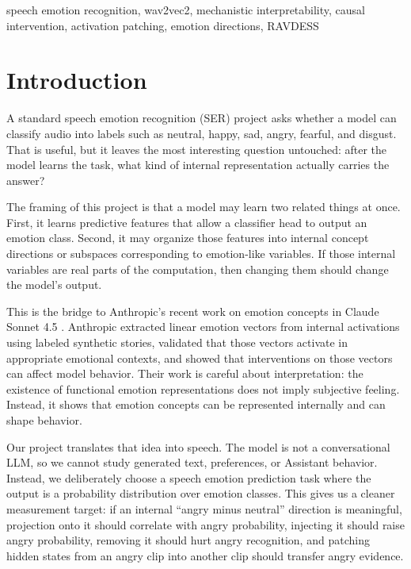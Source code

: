 \documentclass[conference]{IEEEtran}
\begin{document}
\begin{IEEEkeywords}
speech emotion recognition, wav2vec2, mechanistic interpretability, causal intervention, activation patching, emotion directions, RAVDESS
\end{IEEEkeywords}

\section{Introduction}

A standard speech emotion recognition (SER) project asks whether a model can classify audio into labels such as neutral, happy, sad, angry, fearful, and disgust. That is useful, but it leaves the most interesting question untouched: after the model learns the task, what kind of internal representation actually carries the answer?

The framing of this project is that a model may learn two related things at once. First, it learns predictive features that allow a classifier head to output an emotion class. Second, it may organize those features into internal concept directions or subspaces corresponding to emotion-like variables. If those internal variables are real parts of the computation, then changing them should change the model's output.

This is the bridge to Anthropic's recent work on emotion concepts in Claude Sonnet 4.5 \cite{sofroniew2026emotion}. Anthropic extracted linear emotion vectors from internal activations using labeled synthetic stories, validated that those vectors activate in appropriate emotional contexts, and showed that interventions on those vectors can affect model behavior. Their work is careful about interpretation: the existence of functional emotion representations does not imply subjective feeling. Instead, it shows that emotion concepts can be represented internally and can shape behavior.

Our project translates that idea into speech. The model is not a conversational LLM, so we cannot study generated text, preferences, or Assistant behavior. Instead, we deliberately choose a speech emotion prediction task where the output is a probability distribution over emotion classes. This gives us a cleaner measurement target: if an internal ``angry minus neutral'' direction is meaningful, projection onto it should correlate with angry probability, injecting it should raise angry probability, removing it should hurt angry recognition, and patching hidden states from an angry clip into another clip should transfer angry evidence.
\end{document}
